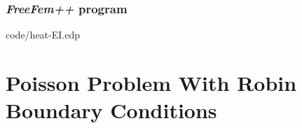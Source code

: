 \documentclass[12pt]{article}
\newcommand{\FF}{\textit{FreeFem++}\xspace}
\begin{document}

\subsubsection{\FF program}


{code/heat-EI.edp}

\appendix

\section{Poisson Problem With Robin Boundary Conditions}
\end{document}
